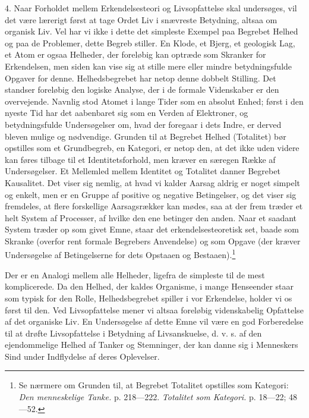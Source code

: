 \documentclass[12pt]{article}
\newcommand{\opage}[1]{\marginnote{\footnotesize\textit{[#1]}}}
\begin{document}
\opage{21}4. Naar Forholdet mellem Erkendelsesteori og Livsopfattelse
skal undersøges, vil det være lærerigt først at tage Ordet \guillemotright{}Liv\guillemotleft{} i
snævreste Betydning, altsaa om organisk Liv. Vel har vi ikke i dette
det simpleste Exempel paa Begrebet Helhed og paa de Problemer, dette
Begreb stiller. En Klode, et Bjerg, et geologisk Lag, et Atom er
ogsaa Helheder, der foreløbig kan optræde som Skranker for
Erkendelsen, men siden kan vise sig at stille mere eller mindre
betydningsfulde Opgaver for denne. Helhedsbegrebet har netop denne
dobbelt Stilling. Det standser foreløbig den logiske Analyse, der i de
formale Videnskaber er den overvejende. Navnlig stod Atomet i lange
Tider som en absolut Enhed; først i den nyeste Tid har det aabenbaret
sig som en Verden af Elektroner, og betydningsfulde Undersøgelser om,
hvad der foregaar i dets Indre, er derved bleven mulige og nødvendige.
Grunden til at Begrebet Helhed (Totalitet) bør opstilles som et
Grundbegreb, en Kategori, er netop den, at det ikke uden videre kan
føres tilbage til et Identitetsforhold, men kræver en særegen Række af
Undersøgelser. Et Mellemled mellem Identitet og Totalitet danner
Begrebet Kausalitet. Det viser sig nemlig, at hvad vi kalder Aarsag
aldrig er noget simpelt og enkelt, men er en Gruppe af positive og
negative Betingelser, og det viser sig fremdeles, at flere forskellige
Aarsagsrækker kan mødes, saa at der frem%
\setcounter{footnote}{0}%
\opage{22}træder et helt System af Processer, af hvilke den ene betinger
den anden. Naar et saadant System træder op som givet Emne, staar det
erkendelsesteoretisk set, baade som Skranke (overfor rent formale
Begrebers Anvendelse) og som Opgave (der kræver Undersøgelse af
Betingelserne for dets Opstaaen og Bestaaen).\footnote{Se nærmere om
Grunden til, at Begrebet Totalitet opstilles som Kategori: \textit{Den
menneskelige Tanke.} p. 218---222. \textit{Totalitet som Kategori.} p.
18---22; 48---52.}

Der er en Analogi mellem alle Helheder, ligefra de simpleste til de
mest komplicerede. Da den Helhed, der kaldes Organisme, i mange
Henseender staar som typisk for den Rolle, Helhedsbegrebet spiller i
vor Erkendelse, holder vi os først til den. Ved Livsopfattelse mener
vi altsaa foreløbig videnskabelig Opfattelse af det organiske Liv. En
Undersøgelse af dette Emne vil være en god Forberedelse til at drøfte
Livsopfattelse i Betydning af Livsanskuelse, d. v. s. af den
ejendommelige Helhed af Tanker og Stemninger, der kan danne sig i
Menneskers Sind under Indflydelse af deres Oplevelser.
\end{document}
